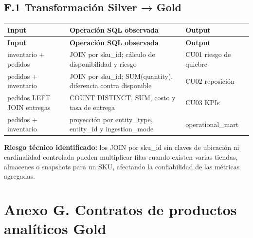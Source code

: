 \documentclass[11pt]{article}
\begin{document}
\subsection{F.1 Transformación Silver → Gold}

\begingroup\small
\begin{longtable}{@{}>{\raggedright\arraybackslash}p{}>{\raggedright\arraybackslash}p{}>{\raggedright\arraybackslash}p{}@{}}
\toprule
\textbf{Input} & \textbf{Operación SQL observada} & \textbf{Output} \\
\midrule
\endfirsthead
\toprule
\textbf{Input} & \textbf{Operación SQL observada} & \textbf{Output} \\
\midrule
\endhead
inventario + pedidos & JOIN por sku\_\allowbreak{}id; cálculo de disponibilidad y riesgo & CU01 riesgo de quiebre \\
pedidos + inventario & JOIN por sku\_\allowbreak{}id; SUM(quantity), diferencia contra disponible & CU02 reposición \\
pedidos LEFT JOIN entregas & COUNT DISTINCT, SUM, costo y tasa de entrega & CU03 KPIs \\
pedidos + inventario & proyección por entity\_\allowbreak{}type, entity\_\allowbreak{}id y ingestion\_\allowbreak{}mode & operational\_\allowbreak{}mart \\
\bottomrule
\end{longtable}
\endgroup

\textbf{Riesgo técnico identificado:} los JOIN por sku\_\allowbreak{}id sin claves de ubicación ni cardinalidad controlada pueden multiplicar filas cuando existen varias tiendas, almacenes o snapshots para un SKU, afectando la confiabilidad de las métricas agregadas.\par




\clearpage
\section*{Anexo G. Contratos de productos analíticos Gold}
\end{document}
